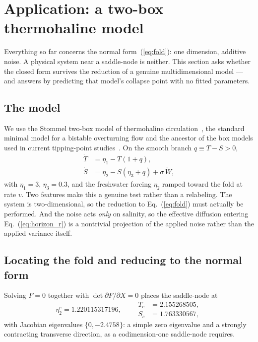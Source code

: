 \documentclass[%
 twocolumn,
 superscriptaddress,
 amsmath,amssymb,
 aps,
 pre,
 floatfix,
]{revtex4-2}
\begin{document}
\section{\label{sec:stommel}Application: a two-box thermohaline model}

Everything so far concerns the normal form~(\ref{eq:fold}): one dimension, additive noise.  A physical system near a saddle-node is neither.  This section asks whether the closed form survives the reduction of a genuine multidimensional model --- and answers by predicting that model's collapse point with no fitted parameters.

\subsection{The model}

We use the Stommel two-box model of thermohaline circulation~\cite{Stommel1961,Cessi1994}, the standard minimal model for a bistable overturning flow and the ancestor of the box models used in current tipping-point studies~\cite{Alkhayuon2019,Ditlevsen2023}.  On the smooth branch $q\equiv T-S>0$,
\begin{equation}
\label{eq:stommel}
\begin{aligned}
\dot T&=\eta_1-T(1+q),\\
\dot S&=\eta_2-S(\eta_3+q)+\sigma\,\dot W,
\end{aligned}
\end{equation}
with $\eta_1=3$, $\eta_3=0.3$, and the freshwater forcing $\eta_2$ ramped toward the fold at rate $v$.  Two features make this a genuine test rather than a relabeling.  The system is two-dimensional, so the reduction to Eq.~(\ref{eq:fold}) must actually be performed.  And the noise acts \emph{only} on salinity, so the effective diffusion entering Eq.~(\ref{eq:horizon_r}) is a nontrivial projection of the applied noise rather than the applied variance itself.

\subsection{Locating the fold and reducing to the normal form}

Solving $F=0$ together with $\det\partial F/\partial X=0$ places the saddle-node at
\begin{equation}
\eta_2^c=1.220115317196,\qquad
\begin{aligned}
T_c&=2.155268505,\\ S_c&=1.763330567,
\end{aligned}
\end{equation}
with Jacobian eigenvalues $\{0,-2.4758\}$: a simple zero eigenvalue and a strongly contracting transverse direction, as a codimension-one saddle-node requires.
\end{document}
